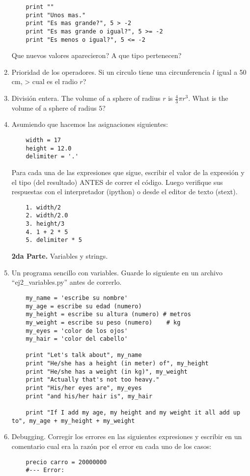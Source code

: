 \documentclass[10pt, twocolumn]{article}
\begin{document}
\begin{enumerate}
\begin{verbatim}
	print ""
	print "Unos mas."
	print "Es mas grande?", 5 > -2
	print "Es mas grande o igual?", 5 >= -2
	print "Es menos o igual?", 5 <= -2
\end{verbatim}
Que nuevos valores aparecieron? A que tipo pertenecen?

\item Prioridad de los operadores. Si un circulo tiene una circunferencia $l$ igual a 50 cm, > cual es el radio $r$?

\item División entera. The volume of a sphere of radius $r$ is $\frac43 \pi r^3$. What is the volume of a sphere of radius $5$?

\item Asumiendo que hacemos las asignaciones siguientes:
\begin{verbatim}
	width = 17
	height = 12.0
	delimiter = '.'
\end{verbatim}
Para cada una de las expresiones que sigue, escribir el valor de la expresión y el tipo (del resultado) ANTES de correr el código. Luego verifique sus respuestas con el interpretador (ipython) o desde el editor de texto (stext).
\begin{verbatim}
	1. width/2
	2. width/2.0
	3. height/3
	4. 1 + 2 * 5
	5. delimiter * 5
\end{verbatim}


\vspace{5mm}
{\bf 2da Parte.} Variables y strings.
\item Un programa sencillo con variables. Guarde lo siguiente en un archivo ``ej2\_variables.py'' antes de correrlo.
\begin{verbatim}
	my_name = 'escribe su nombre'
	my_age = escribe su edad (numero)
	my_height = escribe su altura (numero) # metros
	my_weight = escribe su peso (numero)	# kg
	my_eyes = 'color de los ojos'
	my_hair = 'color del cabello'
	
	print "Let's talk about", my_name
	print "He/she has a height (in meter) of", my_height
	print "He/she has a weight (in kg)", my_weight
	print "Actually that's not too heavy."
	print "His/her eyes are", my_eyes
	print "and his/her hair is", my_hair

	print "If I add my age, my height and my weight	it all add up to", my_age + my_height + my_weight
\end{verbatim}

\item Debugging. Corregir los errores en las siguientes expresiones y escribir en un comentario cual era la razón por el error en cada uno de los casos:
\begin{verbatim}
	precio carro = 20000000
	#--- Error: 
	

\end{verbatim}
\end{enumerate}
\end{document}
